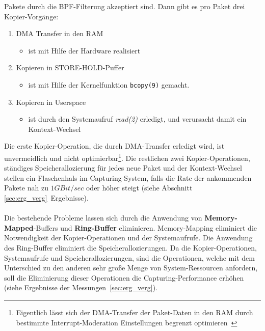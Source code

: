 Pakete durch die BPF-Filterung akzeptiert sind. Dann gibt es pro Paket drei
Kopier-Vorgänge:
\begin{enumerate}
\item DMA Transfer in den RAM
	\begin{itemize}
		\item ist mit Hilfe der Hardware realisiert
	\end{itemize}
\item Kopieren in STORE-HOLD-Puffer
	\begin{itemize}
		\item ist mit Hilfe der Kernelfunktion \verb+bcopy(9)+ gemacht. 
	\end{itemize}
\item Kopieren in Userspace
	\begin{itemize}
		\item ist durch den Systemaufruf \emph{read(2)} erledigt, und verursacht damit
			ein Kontext-Wechsel
	\end{itemize}
\end{enumerate}
Die erste Kopier-Operation, die durch DMA-Transfer erledigt wird, ist
unvermeidlich und nicht optimierbar\footnote{Eigentlich lässt sich der
DMA-Transfer der Paket-Daten in den RAM durch bestimmte Interrupt-Moderation
Einstellungen begrenzt optimieren~\cite{e1000_sdm}}. Die restlichen zwei
Kopier-Operationen, ständiges Speicherallozierung für jedes neue Paket und der
Kontext-Wechsel stellen ein Flaschenhals im Capturing-System, falls die Rate
der ankommenden Pakete nah zu $1GBit/sec$ oder höher steigt (siehe Abschnitt
\ref{sec:erg_verg}~Ergebnisse).\\\\
%
Die bestehende Probleme lassen sich durch die Anwendung von
\textbf{Memory-Mapped}-Buffers und \textbf{Ring-Buffer} eliminieren.
Memory-Mapping eliminiert die Notwendigkeit der Kopier-Operationen und der
Systemaufrufe.  Die Anwendung des Ring-Buffer eliminiert die
Speicherallozierungen. Da die Kopier-Operationen, Systemaufrufe und
Speicherallozierungen, sind die Operationen, welche mit dem Unterschied zu den
anderen sehr große Menge von System-Ressourcen anfordern, soll die Eliminierung
dieser Operationen die Capturing-Performance erhöhen (siehe Ergebnisse der 
Messungen~\ref{sec:erg_verg}).
\newpage
{}
